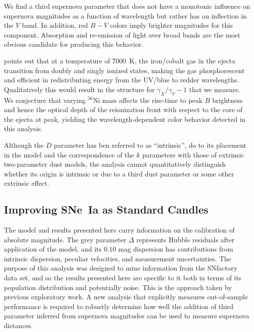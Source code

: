 \documentclass{aastex61}   	%
\begin{document}
We find a third supernova parameter that does not have a monotonic influence on supernova magnitudes as a function
of wavelength but rather has an inflection in the $V$ band.  In addition, red $B-V$ colors imply brighter magnitudes
for this component.  Absorption and re-emission of light
over broad bands are the most obvious candidate for producing this behavior.

\citet{2006ApJ...649..939K} points out that at a temperature of 7000~K, the iron/cobalt gas in the ejecta transition
from doubly and singly ionized states, making the gas phosphorescent and efficient in redistributing energy from the UV/blue to redder
wavelengths.  Qualitatively this would result in the structure for $\gamma_X/\gamma_V-1$ that we measure.
We conjecture that varying $^{56}$Ni mass affects the rise-time to peak $B$ brightness and hence the optical depth
of the reionization front with respect to the core of the ejecta at peak, yielding the wavelength-dependent color behavior
detected in this analysis.


Although the $D$ parameter has ben referred to as ``intrinsic'', do to its placement in the model and the correspondence
of the $k$ parameters with those of extrinsic two-parameter dust models, the analysis cannot quantitatively distinguish
whether its origin is intrinsic or due to a third dust parameter or some other extrinsic effect.

\subsection{Improving SNe~Ia as Standard Candles}
The model and results presented here
carry information on the calibration of absolute magnitude.  The grey parameter $\Delta$ represents Hubble residuals after
application of the model, and its  $0.10$ mag dispersion has contributions from intrinsic dispersion, peculiar velocities, and
measurement uncertainties.
\color{red}
The purpose of this analysis was designed to mine information from the SNfactory data set, and so the results presented here
are specific to it both in terms of its population distribution and potentially noise.  This is the approach taken by previous
exploratory work.
A new analysis that explicitly measures out-of-sample performance is required to robustly determine how
well the addition of third parameter inferred from supernova magnitudes can be used to measure supernova distances.
\color{black}
\end{document}
